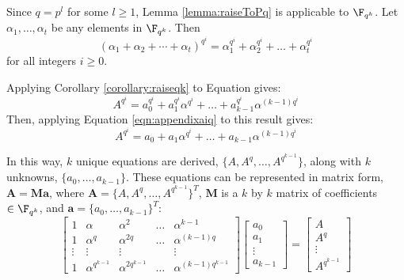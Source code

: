 \begin{Corollary}\label{corollary:raiseqk}
Since $q=p^l$ for some $l \geq 1$, Lemma \ref{lemma:raiseToPq} is applicable to
$\F_{q^k}$.
Let $\alpha_1, \dots, \alpha_t$ be any elements in $\F_{q^k}$. Then
\begin{equation}
(\alpha_1+\alpha_2+\cdots+\alpha_t)^{q^i}=\alpha_1^{q^i}+\alpha_2^{q^i}+\dots+\alpha_t^{q^i}
\end{equation}
for all integers $i \geq 0$.
\end{Corollary}
Applying Corollary \ref{corollary:raiseqk} to Equation \label{eqn:aToFq} gives:
\begin{equation}
A^{q^i}=a_0^{q^i}+a_1^{q^i}\alpha^{q^i}+\dots+a_{k-1}^{q^i}\alpha^{(k-1)q^i} \label{eqn:appendixAqi}
\end{equation}
Then, applying 
Equation \ref{eqn:appendixaiq} to this result gives:
\begin{equation}
A^{q^i}=a_0+a_1\alpha^{q^i}+\dots+a_{k-1}\alpha^{(k-1)q^i} \label{eqn:appendixAqiRewrite}
\end{equation}

In this way, $k$ unique equations are derived, $\{A,A^q,\dots,A^{q^{k-1}}\}$,
along with $k$ unknowns, $\{a_0,\dots,a_{k-1}\}$.
These equations can be represented in matrix form, $\mathbf{A = M a}$, where 
$\mathbf{A}=\{A,A^q,\dots,A^{q^{k-1}}\}^T$, 
$\mathbf{M}$ is
a $k$ by $k$ matrix of coefficients $\in \F_{q^k}$, and $\mathbf{a}=\{a_0,\dots,a_{k-1}\}^T$:
\begin{equation}
\begin{bmatrix}
1      &   \alpha           & \alpha^2           & \dots & \alpha^{k-1}\\
1      &   \alpha^q         & \alpha^{2q}        & \dots & \alpha^{(k-1)q}\\
\vdots & \vdots             & \vdots             & ~     & \vdots \\
1      &   \alpha^{q^{k-1}} & \alpha^{2q^{k-1}} & \dots & \alpha^{(k-1)q^{k-1}}
\end{bmatrix}
\begin{bmatrix}
a_0 \\ a_1 \\ \vdots \\ a_{k-1}
\end{bmatrix}
=
\begin{bmatrix}
A \\ A^q \\ \vdots \\ A^{q^{k-1}}
\end{bmatrix}
\end{equation}

